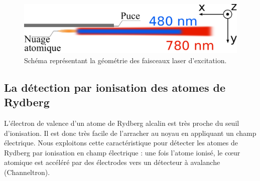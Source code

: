 %
\begin{figure}[!h]
\centering
\includegraphics[width=.6\linewidth]{figures/setup/rydberg/lasers_excit}
\caption[Faisceaux laser pour l'excitation des Rydberg]{Schéma représentant la géométrie des faisceaux laser d'excitation.
}
\label{fig:lasers_excit}
\end{figure}

		
	\subsection{La détection par ionisation des atomes de Rydberg}\label{subsec:detection}
\noindent L'électron de valence d'un atome de Rydberg alcalin est très proche du seuil d'ionisation.
Il est donc très facile de l'arracher au noyau en appliquant un champ électrique.
Nous exploitons cette caractéristique pour détecter les atomes de Rydberg par ionisation en champ électrique :
une fois l'atome ionisé, le c\oe ur atomique est accéléré par des électrodes vers un détecteur à avalanche (Channeltron).


